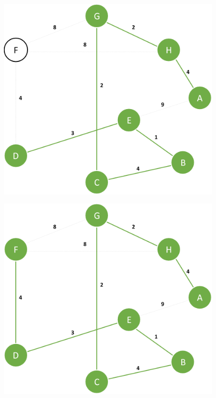 \documentclass{article}
\begin{document}
\begin{figure}[H]
\centering
\includegraphics[scale=0.6]{images/Q2/07.png}
\end{figure}

\begin{figure}[H]
\centering
\includegraphics[scale=0.6]{images/Q2/08.png}
\end{figure}
\end{document}
